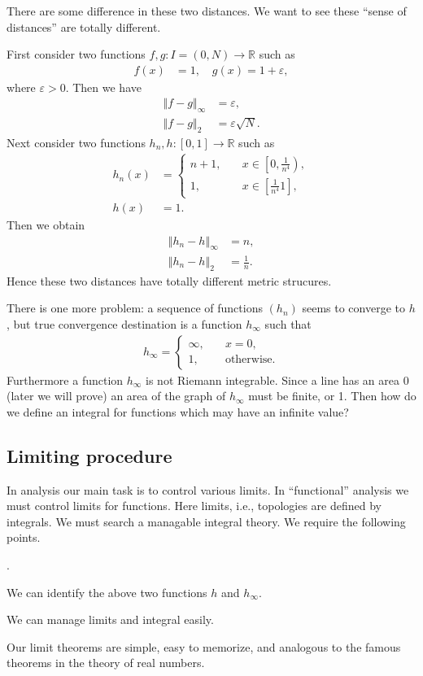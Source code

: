 \documentclass[openany, a4paper, oneside]{book}
\newcounter{enum2}
\renewenvironment{enumerate}{%
\begin{list}%
{%
\arabic{enum2}.\ \,%
}%
{%
\usecounter{enum2}
\setlength{\itemindent}{0pt}%
\setlength{\leftmargin}{6pt}%
\setlength{\rightmargin}{0pt}%
\setlength{\labelsep}{0pt}%
\setlength{\labelwidth}{6pt}%
\setlength{\itemsep}{0pt}%
\setlength{\parsep}{0pt}%
\setlength{\listparindent}{0pt}%
}
}{%
\end{list}%
}
\theoremstyle{break}
\theoremstyle{breakdefn}
\newcommand{\norm}[1]{\left\Vert#1\right\Vert}
\newcommand{\sqbk}[1]{\left[#1\right]}
\newcommand{\bbR}{\mathbb{R}}
\begin{document}
There are some difference in these two distances.
We want to see these ``sense of distances'' are totally different.

First consider two functions $f,g \colon I = (0, N) \to \bbR$ such as
\begin{align}
 f (x)
 &=
 1, \quad
 g (x)
 =
 1 + \varepsilon,
\end{align}
where $\varepsilon > 0$.
Then we have
\begin{align}
 \norm{f - g}_{\infty}
 &=
 \varepsilon, \\
 \norm{f - g}_{2}
 &=
 \varepsilon \sqrt{N}.
\end{align}
Next consider two functions $h_n, h \colon [0, 1] \to \bbR$ such as
\begin{align}
 h_n (x)
 &=
 \begin{cases}
  n+1, \quad &x \in \left[0, \frac{1}{n^4} \right), \\
  1, \quad &x \in \sqbk{\frac{1}{n^4} 1},
 \end{cases} \\
 h (x)
 &= 1.
\end{align}
Then we obtain
\begin{align}
 \norm{h_n - h}_{\infty}
 &=
 n, \\
 \norm{h_n - h}_2
 &=
 \frac{1}{n}.
\end{align}
Hence these two distances have totally different metric strucures.

There is one more problem: a sequence of functions $(h_n)$ seems to converge to $h$,
but true convergence destination is a function $h_{\infty}$ such that
\begin{align}
 h_{\infty}
 =
 \begin{cases}
  \infty, \quad &x = 0, \\
  1, \quad &\text{otherwise}.
 \end{cases}
\end{align}
Furthermore a function $h_{\infty}$ is not Riemann integrable.
Since a line has an area 0 (later we will prove) an area of the graph of $h_{\infty}$ must be finite, or 1.
Then how do we define an integral for functions which may have an infinite value?
\subsection{Limiting procedure}
\label{sec-7-1-1-5}

In analysis our main task is to control various limits.
In ``functional'' analysis we must control limits for functions.
Here limits, i.e., topologies are defined by integrals.
We must search a managable integral theory.
We require the following points.
\begin{enumerate}
\item We can identify the above two functions $h$ and $h_{\infty}$.
\item We can manage limits and integral easily.
\item Our limit theorems are simple, easy to memorize, and analogous to the famous theorems in the theory of real numbers.
\end{enumerate}
\end{document}
